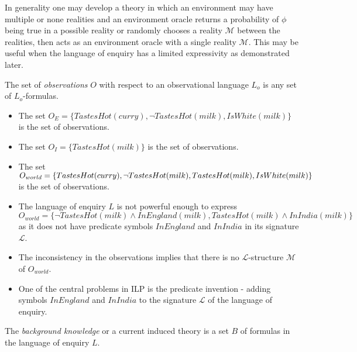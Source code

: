 \begin{remark}
In generality one may develop a theory in which an environment may have multiple or none realities and an environment oracle returns a probability of $\phi$ being true in a possible reality or randomly chooses a reality $\mathcal{M}$ between the realities, then acts as an environment oracle with a single reality $\mathcal{M}$. This may be useful when the language of enquiry has a limited expressivity as demonstrated later.
\end{remark}

\begin{defn}
The set of \emph{observations} $O$ with respect to an observational language $L_o$ is any set of $L_o$-formulas.
\end{defn}

\begin{exmp}
\begin{itemize}
\item The set $O_E=\{TastesHot(curry), \neg TastesHot(milk), IsWhite(milk)\}$ is the set of observations.
\item The set $O_I=\{TastesHot(milk)\}$ is the set of observations.
\item The set $O_{world}=\{TastesHot(curry), \neg TastesHot(milk), TastesHot(milk), \\
IsWhite(milk)\}$ is the set of observations.
\end{itemize}
\end{exmp}

\begin{remark}
\begin{itemize}
\item The language of enquiry $L$ is not powerful enough to express $O_{world}=\{\neg TastesHot(milk) \land InEngland(milk), TastesHot(milk) \land InIndia(milk)\}$
 as it does not have predicate symbols $InEngland$ and $InIndia$ in its signature $\mathcal{L}$.
\item The inconsistency in the observations implies that there is no $\mathcal{L}$-structure $\mathcal{M}$ of $O_{world}$.
\item One of the central problems in ILP is the predicate invention - adding symbols $InEngland$ and $InIndia$ to the signature $\mathcal{L}$ of the language of enquiry.
\end{itemize}
\end{remark}

\begin{defn}
The \emph{background knowledge} or a current induced theory is a set $B$ of formulas in the language of enquiry $L$.
\end{defn}

